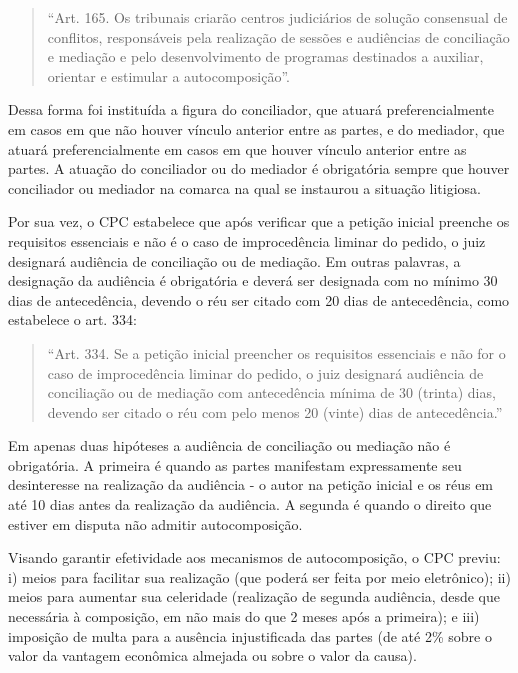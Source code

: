 \documentclass[]{report}
\begin{document}
\begin{quote}
``Art. 165. Os tribunais criarão centros judiciários de solução
consensual de conflitos, responsáveis pela realização de sessões e
audiências de conciliação e mediação e pelo desenvolvimento de programas
destinados a auxiliar, orientar e estimular a autocomposição''.
\end{quote}

Dessa forma foi instituída a figura do conciliador, que atuará
preferencialmente em casos em que não houver vínculo anterior entre as
partes, e do mediador, que atuará preferencialmente em casos em que
houver vínculo anterior entre as partes. A atuação do conciliador ou do
mediador é obrigatória sempre que houver conciliador ou mediador na
comarca na qual se instaurou a situação litigiosa.

Por sua vez, o CPC estabelece que após verificar que a petição inicial
preenche os requisitos essenciais e não é o caso de improcedência
liminar do pedido, o juiz designará audiência de conciliação ou de
mediação. Em outras palavras, a designação da audiência é obrigatória e
deverá ser designada com no mínimo 30 dias de antecedência, devendo o
réu ser citado com 20 dias de antecedência, como estabelece o art. 334:

\begin{quote}
``Art. 334. Se a petição inicial preencher os requisitos essenciais e
não for o caso de improcedência liminar do pedido, o juiz designará
audiência de conciliação ou de mediação com antecedência mínima de 30
(trinta) dias, devendo ser citado o réu com pelo menos 20 (vinte) dias
de antecedência.''
\end{quote}

Em apenas duas hipóteses a audiência de conciliação ou mediação não é
obrigatória. A primeira é quando as partes manifestam expressamente seu
desinteresse na realização da audiência - o autor na petição inicial e
os réus em até 10 dias antes da realização da audiência. A segunda é
quando o direito que estiver em disputa não admitir autocomposição.

Visando garantir efetividade aos mecanismos de autocomposição, o CPC
previu: i) meios para facilitar sua realização (que poderá ser feita por
meio eletrônico); ii) meios para aumentar sua celeridade (realização de
segunda audiência, desde que necessária à composição, em não mais do que
2 meses após a primeira); e iii) imposição de multa para a ausência
injustificada das partes (de até 2\% sobre o valor da vantagem econômica
almejada ou sobre o valor da causa).
\end{document}
